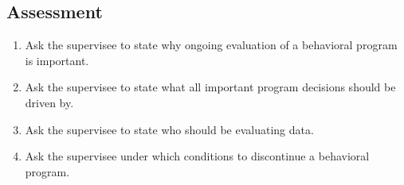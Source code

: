 \subsection{Assessment}
\begin{enumerate}
\item Ask the supervisee to state why ongoing evaluation of a behavioral program is important.
\item Ask the supervisee to state what all important program decisions should be driven by.
\item Ask the supervisee to state who should be evaluating data.
\item Ask the supervisee under which conditions to discontinue a behavioral program.
%
\end{enumerate}
%
